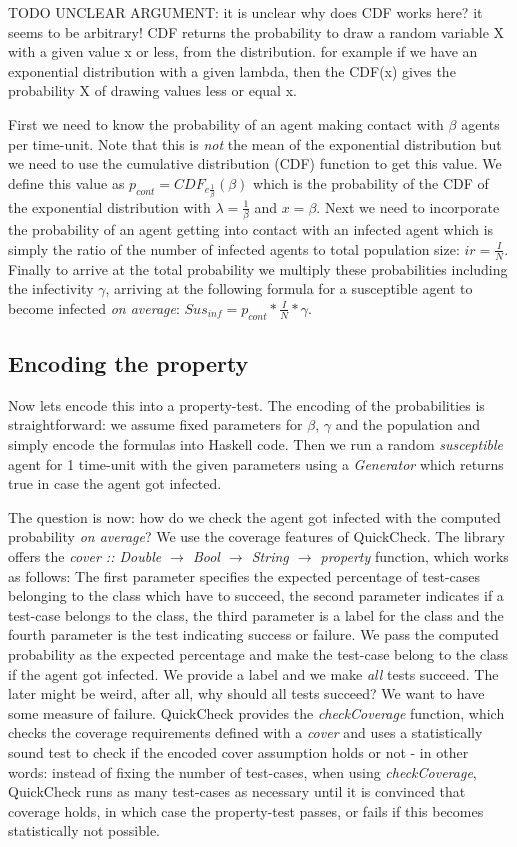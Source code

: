 TODO UNCLEAR ARGUMENT: it is unclear why does CDF works here? it seems to be arbitrary! CDF returns the probability to draw a random variable X with a given value x or less, from the distribution. for example if we have an exponential distribution with a given lambda, then the CDF(x) gives the probability X of drawing values less or equal x.

First we need to know the probability of an agent making contact with $\beta$ agents per time-unit. Note that this is \textit{not} the mean of the exponential distribution but we need to use the cumulative distribution (CDF) function to get this value. We define this value as $p_{cont} = CDF_{e{\frac{1}{\beta}}} (\beta)$ which is the probability of the CDF of the exponential distribution with $\lambda = \frac{1}{\beta}$ and $x = \beta$.
Next we need to incorporate the probability of an agent getting into contact with an infected agent which is simply the ratio of the number of infected agents to total population size: $ir = \frac{I}{N}$. Finally to arrive at the total probability we multiply these probabilities including the infectivity $\gamma$, arriving at the following formula for a susceptible agent to become infected \textit{on average}: $Sus_{inf} = p_{cont} * \frac{I}{N} * \gamma$.

\subsection{Encoding the property}
Now lets encode this into a property-test. The encoding of the probabilities is straightforward: we assume fixed parameters for $\beta$, $\gamma$ and the population and simply encode the formulas into Haskell code. Then we run a random \textit{susceptible} agent for 1 time-unit with the given parameters using a \textit{Generator} which returns true in case the agent got infected. 

The question is now: how do we check the agent got infected with the computed probability \textit{on average}? We use the coverage features of QuickCheck. The library offers the \textit{cover :: Double $\rightarrow$ Bool $\rightarrow$ String $\rightarrow$ property} function, which works as follows: The first parameter specifies the expected percentage of test-cases belonging to the class which have to succeed, the second parameter indicates if a test-case belongs to the class, the third parameter is a label for the class and the fourth parameter is the test indicating success or failure. We pass the computed probability as the expected percentage and make the test-case belong to the class if the agent got infected. We provide a label and we make \textit{all} tests succeed. The later might be weird, after all, why should all tests succeed? We want to have some measure of failure. QuickCheck provides the \textit{checkCoverage} function, which checks the coverage requirements defined with a \textit{cover} and uses a statistically sound test to check if the encoded cover assumption holds or not - in other words: instead of fixing the number of test-cases, when using \textit{checkCoverage}, QuickCheck runs as many test-cases as necessary until it is convinced that coverage holds, in which case the property-test passes, or fails if this becomes statistically not possible.

